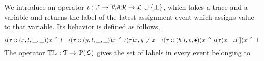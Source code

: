 We introduce an operator $\iota : \mathcal{T} \to \mathcal{VAR} \to \mathcal{L} \cup \{\bot\}$, which 
takes a trace and a variable and returns the label of the latest assignment event which assigns value to that variable.
Its behavior is defined as follows,
  \[
  \iota(\mathtt{\tau}  :: (x, l, \_, \_)) x \triangleq l
  ~~~
  \iota(\mathtt{\tau}  :: (y, l, \_, \_)) x \triangleq \iota(\mathtt{\tau} ) x, y \neq x
  ~~~
  \iota(\mathtt{\tau} :: (b, l, v, \bullet)) x \triangleq \iota(\mathtt{\tau}) x
  ~~~
  \iota({[]}) x \triangleq \bot
  \]
%
  The operator $\mathbb{TL} : \mathcal{T} \to \mathcal{P}{(\mathcal{L})}$ gives the set of labels in every event belonging to 
